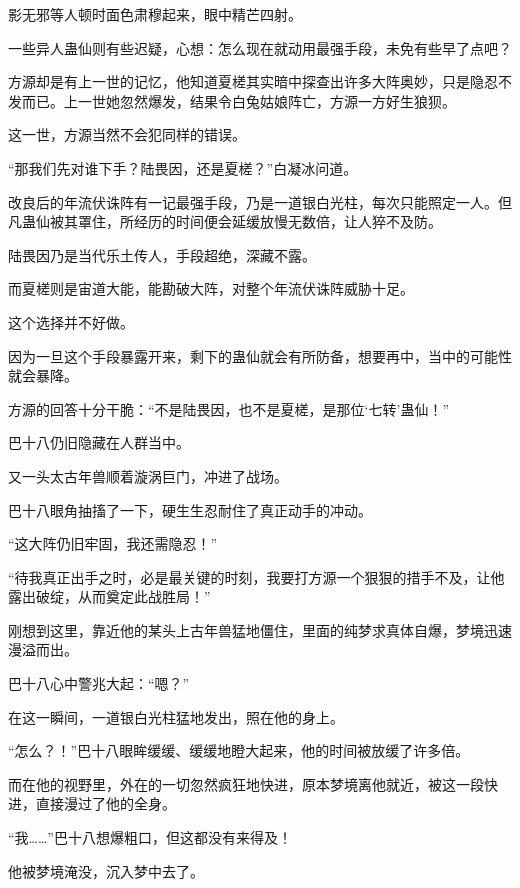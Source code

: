 
\begin{this_body}

影无邪等人顿时面色肃穆起来，眼中精芒四射。

一些异人蛊仙则有些迟疑，心想：怎么现在就动用最强手段，未免有些早了点吧？

方源却是有上一世的记忆，他知道夏槎其实暗中探查出许多大阵奥妙，只是隐忍不发而已。上一世她忽然爆发，结果令白兔姑娘阵亡，方源一方好生狼狈。

这一世，方源当然不会犯同样的错误。

“那我们先对谁下手？陆畏因，还是夏槎？”白凝冰问道。

改良后的年流伏诛阵有一记最强手段，乃是一道银白光柱，每次只能照定一人。但凡蛊仙被其罩住，所经历的时间便会延缓放慢无数倍，让人猝不及防。

陆畏因乃是当代乐土传人，手段超绝，深藏不露。

而夏槎则是宙道大能，能勘破大阵，对整个年流伏诛阵威胁十足。

这个选择并不好做。

因为一旦这个手段暴露开来，剩下的蛊仙就会有所防备，想要再中，当中的可能性就会暴降。

方源的回答十分干脆：“不是陆畏因，也不是夏槎，是那位‘七转’蛊仙！”

巴十八仍旧隐藏在人群当中。

又一头太古年兽顺着漩涡巨门，冲进了战场。

巴十八眼角抽搐了一下，硬生生忍耐住了真正动手的冲动。

“这大阵仍旧牢固，我还需隐忍！”

“待我真正出手之时，必是最关键的时刻，我要打方源一个狠狠的措手不及，让他露出破绽，从而奠定此战胜局！”

刚想到这里，靠近他的某头上古年兽猛地僵住，里面的纯梦求真体自爆，梦境迅速漫溢而出。

巴十八心中警兆大起：“嗯？”

在这一瞬间，一道银白光柱猛地发出，照在他的身上。

“怎么？！”巴十八眼眸缓缓、缓缓地瞪大起来，他的时间被放缓了许多倍。

而在他的视野里，外在的一切忽然疯狂地快进，原本梦境离他就近，被这一段快进，直接漫过了他的全身。

“我……”巴十八想爆粗口，但这都没有来得及！

他被梦境淹没，沉入梦中去了。


\end{this_body}
